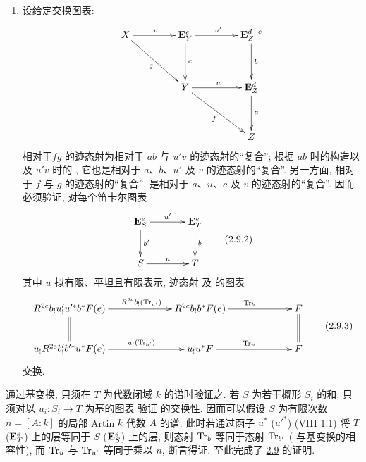 \begin{enumerate}
结论中的条件也表示, $\Tr_{fgh}$ 为 $\Tr_{f}$、$\Tr_{g}$ 及 $\Tr_{h}$ 的“复合”.

\item 设给定交换图表:
$$
\xymatrix@R=1.25cm@C=1.5cm{
X \ar[r]^{v} \ar[rd]_{g}& \EE^{e}_Y \ar[r]^{u'}\ar[d]^{c} & \EE_Z^{d+e}\ar[d]^{b} \\
            &     Y   \ar[r]^{u} \ar[rd]_{f}                       & \EE_Z^{d}\ar[d]^{a}  \\
            &                                  &     Z
}
$$
相对于\pageoriginale $fg$ 的迹态射为相对于 $ab$ 与 $u'v$ 的迹态射的“复合”; 根据 $ab$ 时的构造以及 $u'v$ 时的 , 它也是相对于 $a$、$b$、$u'$ 及 $v$ 的迹态射的“复合”. 另一方面, 相对于 $f$ 与 $g$ 的迹态射的“复合”, 是相对于 $a$、$u$、$c$ 及 $v$ 的迹态射的“复合”. 因而必须验证, 对每个笛卡尔图表
\begin{equation*}
\vcenter{
\xymatrix@C=1.25cm@R=1cm{
\EE^{e}_S  \ar[d]^{b'} \ar[r]^{u'}   & \EE^{e}_T \ar[d]^{b}\\
    S      \ar[r]^{u}     &      T
}}\tag{2.9.2}
\end{equation*}%
其中 $u$ 拟有限、平坦且有限表示, 迹态射  及  的图表
\begin{equation*}
\vcenter{
\xymatrix@C=2.25cm{
R^{2e}b_!u'_! u'^{\ast}b {}^{\ast} F(e) \ar[r]^(.55){R^{2e}b_!
  (\Tr_{u'})}\ar@{=}[d]& R^{2e}b_! b^{\ast} F(e)\ar[r]^{\Tr_b}
&  F \ar@{=}[d]\\
u_! R^{2e}b'_! b'^{\ast} u^{\ast} F(e)\ar[r]^(.55){u_!(\Tr_{b'})} & u_!
u^{\ast} F \ar[r]^{\Tr_u}& F
}}\tag{2.9.3}
\end{equation*}%
交换.
\end{enumerate}


通过基变换, 只须在 $T$ 为代数闭域 $k$ 的谱时验证之. 若 $S$ 为若干概形 $S_{i}$ 的和, 只须对以 $u_{i}:S_{i}\rightarrow T$ 为基的图表  验证  的交换性. 因而可以假设 $S$ 为有限次数 $n=[A:k]$ 的局部 Artin $k$ 代数 $A$ 的谱. 此时若通过函子 $u^{\ast}$ (\resp ${u'}^{\ast}$) (VIII \hyperref[VIII.thm1.1]{1.1}) 将 $T$ (\resp $\mathbf{E}^{e}_{T}$) 上的层等同于 $S$ (\resp $\mathbf{E}^{e}_{S}$) 上的层, 则态射 $\operatorname{Tr}_{b}$ 等同于态射 $\operatorname{Tr}_{b'}$ ( 与基变换的相容性), 而 $\operatorname{Tr}_{u}$ 与 $\operatorname{Tr}_{u'}$ 等同于乘以 $n$, 断言得证. 至此完成了 \hyperref[XVIII.thm2.9]{2.9} 的证明.

